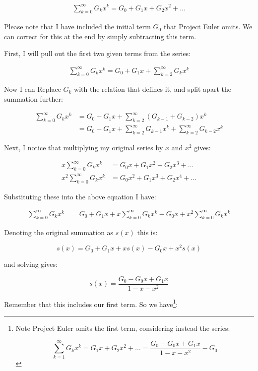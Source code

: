 \documentclass[12pt]{article}
\begin{document}
\begin{align*}
\sum_{k=0}^\infty G_k x^k = G_0 + G_1 x + G_2 x^2 + \dots
\end{align*}

Please note that I have included the initial term $G_0$ that Project Euler omits. We can correct for this at the end by simply subtracting this term.

\newpage

First, I will pull out the first two given terms from the series:

\begin{align*}
\sum_{k=0}^\infty G_k x^k = G_0 + G_1x + \sum_{k=2}^\infty G_k x^k
\end{align*}

Now I can Replace $G_k$  with the relation that defines it, and split apart the summation further:


\begin{align*}
\sum_{k=0}^\infty G_k x^k &= G_0 + G_1x + \sum_{k=2}^\infty (G_{k-1} + G_{k-2}) x^k \\
				   &= G_0 + G_1x +  \sum_{k=2}^\infty G_{k-1} x^k + \sum_{k=2}^\infty G_{k-2} x^k
\end{align*}

Next, I notice that multiplying my original series by $x$ and $x^2$ gives:

\begin{align*}
x\sum_{k=0}^\infty G_k x^k &= G_0x + G_1 x^2 + G_2 x^3 + \dots\\
x^2\sum_{k=0}^\infty G_k x^k &= G_0x^2 + G_1 x^3 + G_2 x^4 + \dots
\end{align*}

Substituting these into the above equation I have:

\begin{align*}
\sum_{k=0}^\infty G_k x^k &= G_0 + G_1 x + x\sum_{k=0}^\infty G_k x^k - G_0 x + x^2\sum_{k=0}^\infty G_k x^k
\end{align*}

\newpage

Denoting the original summation as $s(x)$ this is:

$$
s(x) =  G_0 + G_1 x + xs(x) - G_0 x + x^2 s(x)
$$ 

and solving gives:

$$
s(x) = \dfrac{G_0 - G_0 x + G_1 x}{1 - x - x^2}
$$

Remember that this includes our first term. So we have\footnote{

Note Project Euler omits the first term, considering instead the series:

$$
\sum_{k=1}^\infty G_k x^k = G_1 x + G_2 x^2 + \dots =  \dfrac{G_0 - G_0 x + G_1 x}{1 - x - x^2} - G_0
$$

}:
\end{document}
